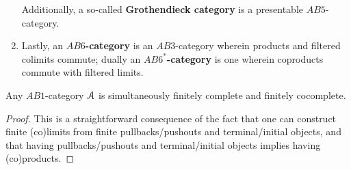 \begin{definition}
\begin{enumerate}
                            Additionally, a so-called \textbf{Grothendieck category} is a presentable $AB5$-category.
                            \item Lastly, an \textbf{$AB6$-category} is an $AB3$-category wherein products and filtered colimits commute; dually an \textbf{$AB6^*$-category} is one wherein coproducts commute with filtered limits.
                        \end{enumerate}
                \end{definition}
                
                \begin{proposition} \label{prop: AB1_categories_are_finitely_(co)complete}
                    Any $AB1$-category $\mathcal{A}$ is simultaneously finitely complete and finitely cocomplete.
                \end{proposition}
                    \begin{proof}
                        This is a straightforward consequence of the fact that one can construct finite (co)limits from finite pullbacks/pushouts and terminal/initial objects, and that having pullbacks/pushouts and terminal/initial objects implies having (co)products.
                    \end{proof}
                

